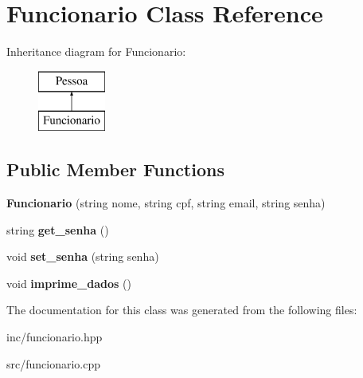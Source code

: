 \hypertarget{class_funcionario}{}\section{Funcionario Class Reference}
\label{class_funcionario}
Inheritance diagram for Funcionario\+:\begin{figure}[H]
\begin{center}
\leavevmode
\includegraphics[height=2.000000cm]{class_funcionario}
\end{center}
\end{figure}
\subsection*{Public Member Functions}
\begin{DoxyCompactItemize}
\item 
\mbox{\label{class_funcionario_aa86fb3649e63c6039998c6484fe3f61e}} 
{\bfseries Funcionario} (string nome, string cpf, string email, string senha)
\item 
\mbox{\label{class_funcionario_a1b39976d01063245c36d3e2532084ef5}} 
string {\bfseries get\+\_\+senha} ()
\item 
\mbox{\label{class_funcionario_a2f6a3b438964dc64418dfe66e0b88c41}} 
void {\bfseries set\+\_\+senha} (string senha)
\item 
\mbox{\label{class_funcionario_a82c56edad048e59b8e64bd194a594287}} 
void {\bfseries imprime\+\_\+dados} ()
\end{DoxyCompactItemize}


The documentation for this class was generated from the following files\+:\begin{DoxyCompactItemize}
\item 
inc/funcionario.\+hpp\item 
src/funcionario.\+cpp\end{DoxyCompactItemize}
